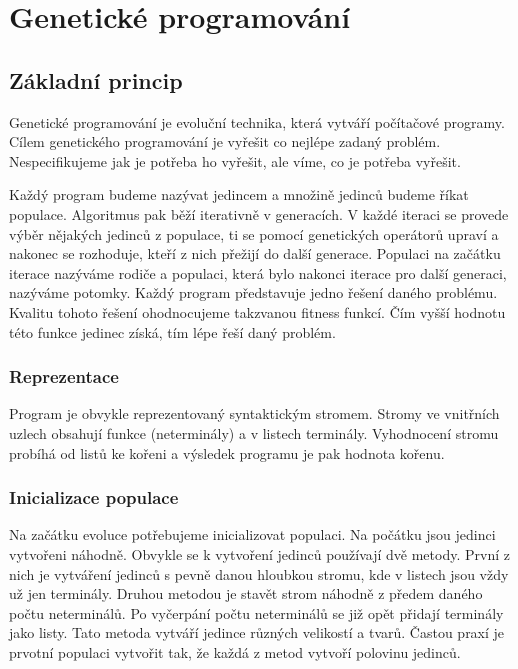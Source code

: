 
\chapter{Genetické programování}

\section{Základní princip}
Genetické programování je evoluční technika, která vytváří počítačové programy. Cílem genetického programování je vyřešit co nejlépe zadaný problém.
Nespecifikujeme jak je potřeba ho vyřešit, ale víme, co je potřeba vyřešit.
\par
Každý program budeme nazývat jedincem a množině jedinců budeme říkat populace. Algoritmus pak běží iterativně v generacích. 
V každé iteraci se provede výběr nějakých jedinců z populace, ti se pomocí genetických operátorů upraví a nakonec se rozhoduje, kteří z nich přežijí do další generace.
Populaci na začátku iterace nazýváme rodiče a populaci, která bylo nakonci iterace pro další generaci, nazýváme potomky.
Každý program představuje jedno řešení daného problému. Kvalitu tohoto řešení ohodnocujeme takzvanou fitness funkcí. Čím vyšší hodnotu této funkce jedinec získá, tím lépe řeší daný problém.
\subsection{Reprezentace}

Program je obvykle reprezentovaný syntaktickým stromem. Stromy ve vnitřních uzlech obsahují funkce (neterminály) a v listech terminály.
Vyhodnocení stromu probíhá od listů ke kořeni a výsledek programu je pak hodnota kořenu.

\subsection{Inicializace populace}
Na začátku evoluce potřebujeme inicializovat populaci. Na počátku jsou jedinci vytvořeni náhodně. Obvykle se k vytvoření jedinců používají dvě metody.
První z nich je vytváření jedinců s pevně danou hloubkou stromu, kde v listech jsou vždy už jen terminály. Druhou metodou je stavět strom náhodně z předem daného počtu neterminálů.
Po vyčerpání počtu neterminálů se již opět přidají terminály jako listy. Tato metoda vytváří jedince různých velikostí a tvarů.
Častou praxí je prvotní populaci vytvořit tak, že každá z metod vytvoří polovinu jedinců. 

